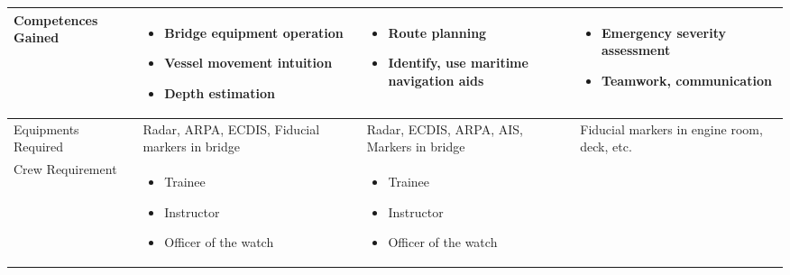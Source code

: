 \begin{table}[h]
\begin{tabular}{@{}p{2.2cm}|p{3cm}|p{3cm}|p{3cm}|@{}}
	\\
		\hline
		Competences Gained & \vspace{-2mm}\begin{itemize}[leftmargin=*,topsep=0pt,align=left,itemsep=0.25pt,after=]
			\renewcommand{\labelitemi}{\scalebox{.9}{\tiny\listsymb}}
			\item Bridge equipment operation
			\item Vessel movement intuition
			\item Depth estimation  
		\end{itemize}
		& \vspace{-2mm}\begin{itemize}[leftmargin=*,topsep=0pt,align=left,itemsep=0.25pt,after=]
			\renewcommand{\labelitemi}{\scalebox{.9}{\tiny\listsymb}} 
			\item Route planning
			\item Identify, use maritime navigation aids
		\end{itemize}
		& \vspace{-2mm}\begin{itemize}[leftmargin=*,topsep=0pt,align=left,itemsep=0.25pt,after=]
			\renewcommand{\labelitemi}{\scalebox{.9}{\tiny\listsymb}}
			\item Emergency severity assessment 
			\item Teamwork, communication 
		\end{itemize}  \\
		\hline
		Equipments Required & Radar, ARPA, ECDIS, Fiducial markers in bridge & Radar, ECDIS, ARPA, AIS, Markers in bridge & Fiducial markers in engine room, deck, etc. \\
		\hline
		Crew Requirement & 
		\vspace{-2mm} \begin{itemize}[leftmargin=*,topsep=0pt,align=left,itemsep=0.25pt,after=]
			\renewcommand{\labelitemi}{\scalebox{.9}{\tiny\listsymb}}
			\item Trainee 
			\item Instructor
			\item Officer of the watch
		\end{itemize}
		&\vspace{-2mm} \begin{itemize}[leftmargin=*,topsep=0pt,align=left,itemsep=0.25pt,after=]
			\renewcommand{\labelitemi}{\scalebox{.9}{\tiny\listsymb}}
			\item Trainee 
			\item Instructor
			\item Officer of the watch

\end{itemize}
\end{tabular}
\end{table}
